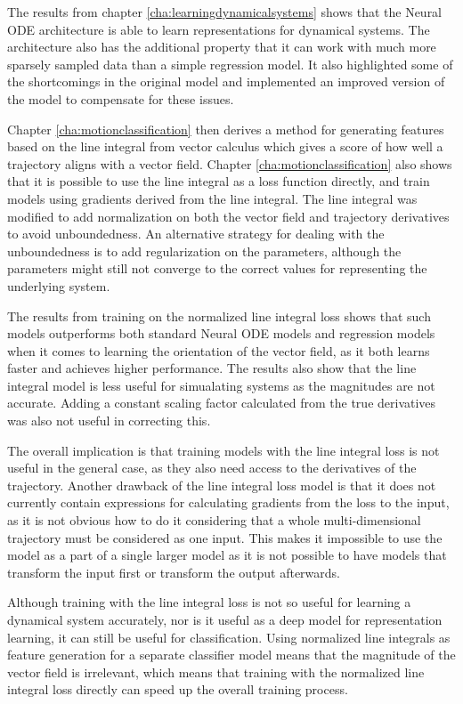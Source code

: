 \documentclass[12pt,a4paper]{book}
\begin{document}
The results from chapter \ref{cha:learningdynamicalsystems} shows that the Neural ODE architecture is able to learn representations for dynamical systems. The architecture also has the additional property that it can work with much more sparsely sampled data than a simple regression model. It also highlighted some of the shortcomings in the original model and implemented an improved version of the model to compensate for these issues.

Chapter \ref{cha:motionclassification} then derives a method for generating features based on the line integral from vector calculus which gives a score of how well a trajectory aligns with a vector field. Chapter \ref{cha:motionclassification} also shows that it is possible to use the line integral as a loss function directly, and train models using gradients derived from the line integral. The line integral was modified to add normalization on both the vector field and trajectory derivatives to avoid unboundedness. An alternative strategy for dealing with the unboundedness is to add regularization on the parameters, although the parameters might still not converge to the correct values for representing the underlying system.

The results from training on the normalized line integral loss shows that such models outperforms both standard Neural ODE models and regression models when it comes to learning the orientation of the vector field, as it both learns faster and achieves higher performance. The results also show that the line integral model is less useful for simualating systems as the magnitudes are not accurate. Adding a constant scaling factor calculated from the true derivatives was also not useful in correcting this.

The overall implication is that training models with the line integral loss is not useful in the general case, as they also need access to the derivatives of the trajectory. Another drawback of the line integral loss model is that it does not currently contain expressions for calculating gradients from the loss to the input, as it is not obvious how to do it considering that a whole multi-dimensional trajectory must be considered as one input. This makes it impossible to use the model as a part of a single larger model as it is not possible to have models that transform the input first or transform the output afterwards.

Although training with the line integral loss is not so useful for learning a dynamical system accurately, nor is it useful as a deep model for representation learning, it can still be useful for classification. Using normalized line integrals as feature generation for a separate classifier model means that the magnitude of the vector field is irrelevant, which means that training with the normalized line integral loss directly can speed up the overall training process.
\end{document}
